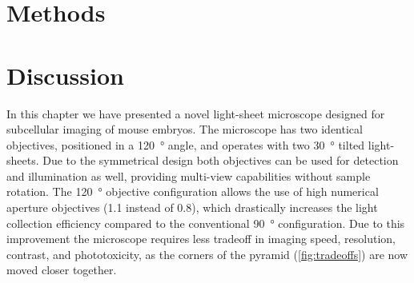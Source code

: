   



\section{Methods}
    

  







\section{Discussion}

  In this chapter we have presented a novel light-sheet microscope designed for subcellular imaging of mouse embryos. The microscope has two identical objectives, positioned in a \SI{120}{\degree} angle, and operates with two \SI{30}{\degree} tilted light-sheets. Due to the symmetrical design both objectives can be used for detection and illumination as well, providing multi-view capabilities without sample rotation. The \SI{120}{\degree} objective configuration allows the use of high numerical aperture objectives (1.1 instead of 0.8), which drastically increases the light collection efficiency compared to the conventional \SI{90}{\degree} configuration. Due to this improvement the microscope requires less tradeoff in imaging speed, resolution, contrast, and phototoxicity, as the corners of the pyramid (\autoref{fig:tradeoffs}) are now moved closer together.

